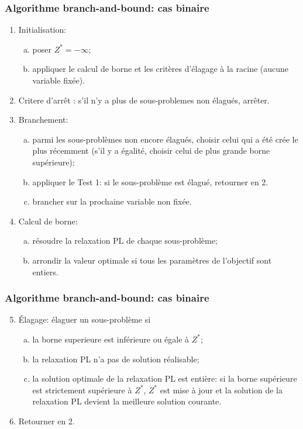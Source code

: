 \documentclass[usepdftitle=false]{beamer}
\begin{document}
\begin{frame}
\frametitle{Algorithme branch-and-bound: cas binaire}

\begin{enumerate}
\item
Initialisation:
\begin{enumerate}[(a)]
\item
poser $Z^* = -\infty$;
\item
appliquer le calcul de borne et les critères d'élagage à la racine (aucune variable fixée).
\end{enumerate}
\item
Critere d'arrêt : s'il n'y a plus de sous-problemes non élagués, arrêter.
\item
Branchement:
\begin{enumerate}[(a)]
\item
parmi les sous-problèmes non encore élagués, choisir celui qui a été crée le plus récemment (s'il y a égalité, choisir celui de plus grande borne supérieure);
\item
appliquer le Test 1: si le sous-problème est élagué,
retourner en 2.
\item
brancher sur la prochaine variable non fixée.
\end{enumerate}
\item
Calcul de borne:
\begin{enumerate}[(a)]
\item
résoudre la relaxation PL de chaque sous-problème;
\item
arrondir la valeur optimale si tous les paramètres de l'objectif sont entiers.
\end{enumerate}
\end{enumerate}

\end{frame}

\begin{frame}
\frametitle{Algorithme branch-and-bound: cas binaire}

\begin{enumerate}
\setcounter{enumi}{4}
\item
Élagage: élaguer un sous-problème si
\begin{enumerate}[(a)]
\item
la borne superieure est inférieure ou égale à $Z^*$;
\item
la relaxation PL n'a pas de solution réalisable;
\item
la solution optimale de la relaxation PL est entière: si la borne supérieure est strictement supérieure à $Z^*$, $Z^*$ est mise à jour et la solution de la relaxation PL devient la meilleure solution courante.
\end{enumerate}
\item
Retourner en 2.
\end{enumerate}

\end{frame}
\end{document}
